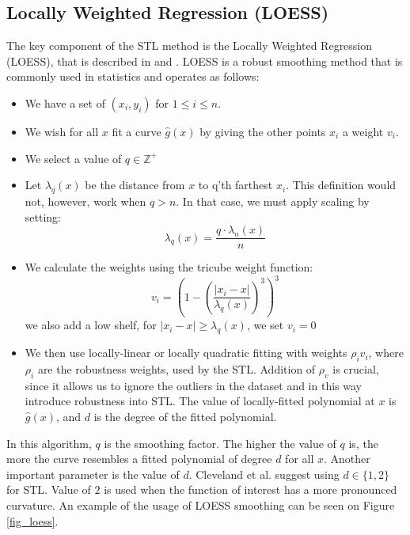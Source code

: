 \documentclass[main.tex]{subfiles}
\begin{document}
\subsection{Locally Weighted Regression (LOESS)}
\label{subsec:locally_weighted_running_line_smoother}
The key component of the STL method is the Locally Weighted Regression (LOESS),
that is described in \cite{loess} and \cite{stl}. LOESS is a robust smoothing method that is
commonly used in statistics and operates as follows:
\begin{itemize}
\item We have a set of $(x_i, y_i)$ for $1 \leq i \leq n$.
\item We wish for all $x$ fit a curve $\hat{g}(x)$ by giving the other points $x_i$ a
  weight $v_i$.
\item We select a value of $q \in \mathbb{Z}^+$
\item Let $\lambda_q(x)$ be the distance from $x$ to q'th farthest $x_i$.
  This definition would not, however, work when $q > n$. In that case, we must
  apply scaling by setting:
  \[
  \lambda_q(x) = \frac{q \cdot \lambda_n(x)}{n}
  \]
\item We calculate the weights using the tricube weight function:
  \[
  v_i = \left( 1 - \left( \frac{| x_i - x |}{\lambda_q(x)}  \right)^3\right)^3
  \]
  we also add a low shelf, for $| x_i - x | \geq \lambda_q(x)$, we set $v_i = 0$
\item We then use locally-linear or locally quadratic fitting with weights
  $\rho_i v_i$, where $\rho_i$ are the robustness weights, used by the STL.
  Addition of $\rho_v$ is crucial, since it allows us to ignore the outliers
  in the dataset and in this way introduce robustness into STL.
  The value of locally-fitted polynomial at $x$ is $\hat{g}(x)$, and $d$ is
  the degree of the fitted polynomial.
\end{itemize}
In this algorithm, $q$ is the smoothing factor. The higher the value of $q$ is, the more
the curve resembles a fitted polynomial of degree $d$ for all $x$. Another
important parameter is the value of $d$. Cleveland et al.
\cite{stl} suggest using $d \in \{1,2\}$ for STL. Value of $2$ is used when the
function of interest has a more pronounced curvature. An example of the usage of
LOESS smoothing can be seen on Figure \ref{fig_loess}.
\end{document}
